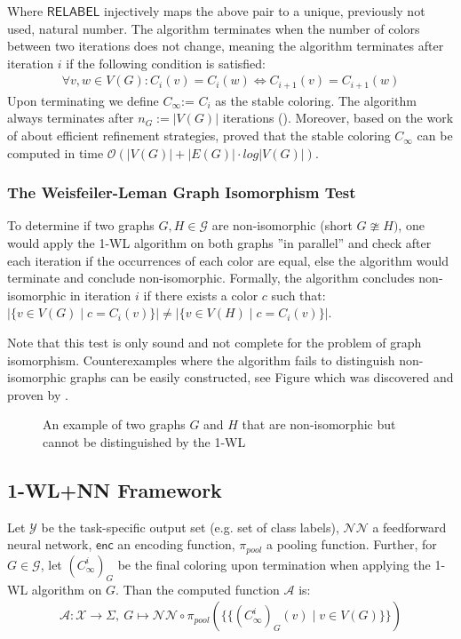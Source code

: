 \documentclass[11pt, dvipsnames, DIV=12]{scrreprt}
\theoremstyle{definition}
\newcommand{\MSopen}{\{\!\!\{}
\newcommand{\MSclose}{\}\!\!\}}
\begin{document}
\noindent Where $\textsf{RELABEL}$ injectively maps the above pair to a unique, previously not used, natural number. The algorithm terminates when the number of colors between two iterations does not change, meaning the algorithm terminates after iteration $i$ if the following condition is satisfied:
\begin{align}
\forall v,w \in V(G):  C_i(v) = C_i(w) \iff C_{i+1}(v) = C_{i+1}(w)
\end{align}
Upon terminating we define $C_{\infty}$:= $C_i$ as the stable coloring. The algorithm always terminates after $n_G:= |V(G)|$ iterations (\cite{Gro2017}). Moreover, based on the work of \cite{Pai+87} about efficient refinement strategies, \cite{Car+82} proved that the stable coloring $C_\infty$ can be computed in time $\mathcal{O}(| V(G) | + |E(G)| \cdot log | V(G) |)$.

\subsubsection{The Weisfeiler-Leman Graph Isomorphism Test}
To determine if two graphs $G, H \in \mathcal{G}$ are non-isomorphic (short $G \ncong H)$, one would apply the 1-WL algorithm on both graphs ''in parallel'' and check after each iteration if the occurrences of each color are equal, else the algorithm would terminate and conclude non-isomorphic. Formally, the algorithm concludes non-isomorphic in iteration $i$ if there exists a color $c$ such that: $|\{ v \in V(G) \mid c = C_i(v)\} | \neq |\{ v \in V(H) \mid c = C_i(v)\} |$.

Note that this test is only sound and not complete for the problem of graph isomorphism. Counterexamples where the algorithm fails to distinguish non-isomorphic graphs can be easily constructed, see Figure  which was discovered and proven by \cite{Cai1992}.

\begin{figure}[H]
    \centering
    
    \caption{An example of two graphs $G$ and $H$ that are non-isomorphic but cannot be distinguished by the 1-WL}
    \label{1-WL Counter Example}
\end{figure}

\subsection{1-WL+NN Framework}\label{sec:1-WL+NN Definition}
Let $\mathcal{Y}$ be the task-specific output set (e.g. set of class labels), $\mathcal{NN}$ a feedforward neural network, $\textsf{enc}$ an encoding function, $\pi_{pool}$ a pooling function. Further, for $G \in \mathcal{G}$, let $(C^i_\infty)_{G}$ be the final coloring upon termination when applying the 1-WL algorithm on $G$. Than the computed function $\mathcal{A}$ is:
\begin{align}
\mathcal{A}: \mathcal{X} \rightarrow \Sigma, \  G \mapsto \mathcal{NN} \circ \pi_{pool}(\MSopen (C^i_\infty)_{G}(v) \mid v \in V(G) \MSclose)
\end{align}
\end{document}
